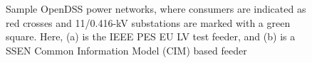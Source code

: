 \begin{figure}\centering
	\caption{Sample OpenDSS power networks, where consumers are indicated as red crosses and 11/0.416-kV substations are marked with a green square. Here, (a) is the IEEE PES EU LV test feeder, and (b) is a SSEN Common Information Model (CIM) based feeder}
	\label{ch4:fig:network}
\end{figure}
